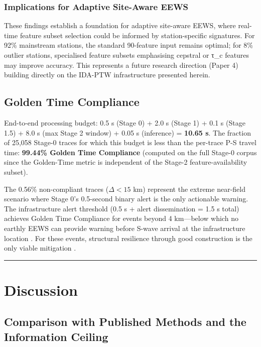 \documentclass[10pt]{article}
\renewcommand{\cite}[1]{\citep{#1}}
\begin{document}
\subsubsection{Implications for Adaptive Site-Aware EEWS}

These findings establish a foundation for adaptive site-aware EEWS, where real-time feature subset selection could be informed by station-specific signatures. For 92\% mainstream stations, the standard 90-feature input remains optimal; for 8\% outlier stations, specialised feature subsets emphasising cepstral or τ\_c features may improve accuracy. This represents a future research direction (Paper 4) building directly on the IDA-PTW infrastructure presented herein.

\subsection{Golden Time Compliance}

End-to-end processing budget: 0.5 s (Stage 0) + 2.0 s (Stage 1) + 0.1 s (Stage 1.5) + 8.0 s (max Stage 2 window) + 0.05 s (inference) = \textbf{10.65 s}. The fraction of 25,058 Stage-0 traces for which this budget is less than the per-trace P-S travel time: \textbf{99.44\% Golden Time Compliance} (computed on the full Stage-0 corpus since the Golden-Time metric is independent of the Stage-2 feature-availability subset).

The 0.56\% non-compliant traces (\(\Delta < 15\) km) represent the extreme near-field scenario where Stage 0's 0.5-second binary alert is the only actionable warning. The infrastructure alert threshold (0.5 s + alert dissemination = 1.5 s total) achieves Golden Time Compliance for events beyond 4 km---below which no earthly EEWS can provide warning before S-wave arrival at the infrastructure location \cite{ref19}. For these events, structural resilience through good construction is the only viable mitigation \cite{ref14}.

\begin{center}\rule{0.5\linewidth}{0.5pt}\end{center}

\section{Discussion}

\subsection{Comparison with Published Methods and the Information Ceiling}
\end{document}
